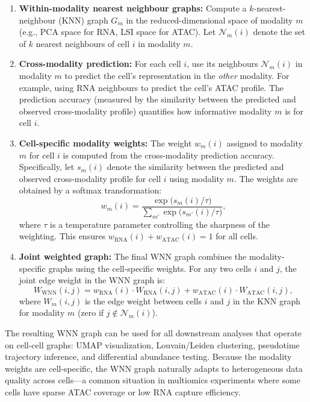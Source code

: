 \begin{enumerate}[itemsep=3pt]
  \item \textbf{Within-modality nearest neighbour graphs:} Compute a $k$-nearest-neighbour (KNN) graph $G_m$ in the reduced-dimensional space of modality $m$ (e.g., PCA space for RNA, LSI space for ATAC). Let $\mathcal{N}_m(i)$ denote the set of $k$ nearest neighbours of cell $i$ in modality $m$.

  \item \textbf{Cross-modality prediction:} For each cell $i$, use its neighbours $\mathcal{N}_m(i)$ in modality $m$ to predict the cell's representation in the \textit{other} modality. For example, using RNA neighbours to predict the cell's ATAC profile. The prediction accuracy (measured by the similarity between the predicted and observed cross-modality profile) quantifies how informative modality $m$ is for cell $i$.

  \item \textbf{Cell-specific modality weights:} The weight $w_m(i)$ assigned to modality $m$ for cell $i$ is computed from the cross-modality prediction accuracy. Specifically, let $s_m(i)$ denote the similarity between the predicted and observed cross-modality profile for cell $i$ using modality $m$. The weights are obtained by a softmax transformation:
  \begin{equation}
    w_m(i) = \frac{\exp\bigl(s_m(i) / \tau\bigr)}{\sum_{m'} \exp\bigl(s_{m'}(i) / \tau\bigr)},
    \label{eq:multiomics:wnn-weights}
  \end{equation}
  where $\tau$ is a temperature parameter controlling the sharpness of the weighting. This ensures $w_{\text{RNA}}(i) + w_{\text{ATAC}}(i) = 1$ for all cells.

  \item \textbf{Joint weighted graph:} The final WNN graph combines the modality-specific graphs using the cell-specific weights. For any two cells $i$ and $j$, the joint edge weight in the WNN graph is:
  \begin{equation}
    W_{\text{WNN}}(i,j) = w_{\text{RNA}}(i) \cdot W_{\text{RNA}}(i,j) + w_{\text{ATAC}}(i) \cdot W_{\text{ATAC}}(i,j),
    \label{eq:multiomics:wnn-graph}
  \end{equation}
  where $W_m(i,j)$ is the edge weight between cells $i$ and $j$ in the KNN graph for modality $m$ (zero if $j \notin \mathcal{N}_m(i)$).
\end{enumerate}

The resulting WNN graph can be used for all downstream analyses that operate on cell-cell graphs: UMAP visualization, Louvain/Leiden clustering, pseudotime trajectory inference, and differential abundance testing. Because the modality weights are cell-specific, the WNN graph naturally adapts to heterogeneous data quality across cells---a common situation in multiomics experiments where some cells have sparse ATAC coverage or low RNA capture efficiency.

